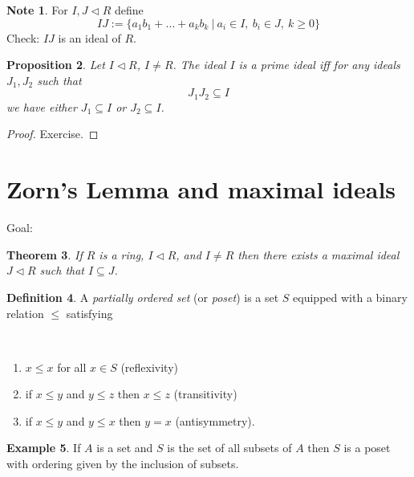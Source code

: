 \documentclass[12pt, letterpaper, oneside]{article}
\theoremstyle{plain}
\newtheorem{theorem}{Theorem}[section]
\newtheorem{proposition}[theorem]{Proposition}
\theoremstyle{definition}
\newtheorem{definition}[theorem]{Definition}
\newtheorem{example}[theorem]{Example}
\newtheorem{note}[theorem]{Note}
\newcommand{\benu}{\begin{enumerate}}
\newcommand{\eenu}{\end{enumerate}}
\newcommand{\vs}{\vskip 5mm}
\newcommand{\isep}[1][0]{\setlength{\itemsep}{#1 mm}}
\begin{document}
\vs\vs

\begin{note}
For $I, J \lhd R$ define 
$$IJ := \{ a_{1}b_{1} + {\dots} + a_{k}b_{k}  \ | \ a_{i} \in I, \ b_{i} \in J, \ k\geq 0 \}$$
Check: $IJ$ is an ideal of $R$.
\end{note}


\vs\vs

\begin{proposition}
\label{PROP_PRIMEIDPRODCHAR}
Let $I\lhd R$, $I\neq R$. The ideal $I$ is a prime ideal iff for any ideals $J_{1}, J_{2}$ such that 
$$J_{1}J_{2}\subseteq I$$
we have either $J_{1}\subseteq I$ or  $J_{2}\subseteq I$.
\end{proposition}

\begin{proof}
Exercise.
\end{proof}




\newpage
\section{Zorn's Lemma and maximal ideals}
\label{SEC_ZORNANDMAXIDEALS}

Goal:

\begin{theorem}
\label{THM_INCINTOMAXID}
If $R$ is a ring,  $I\lhd R$, and $I\neq R$ then there exists a maximal ideal $J\lhd R$ such that 
$I\subseteq J$. 
\end{theorem}

\vs\vs

\begin{definition}
A \emph{partially ordered set} (or \emph{poset}) is a set $S$ equipped with a binary relation $\leq$
satisfying

\vskip -13mm

\ 
\benu
\isep[0]
\item $x\leq x$ for all $x\in S$ (reflexivity)
\item if $x\leq y$ and $y\leq z$ then $x\leq z$ (transitivity)
\item if $x\leq y$ and $y\leq x$ then $y = x$ (antisymmetry). 
\eenu

\end{definition}


\vs\vs

\begin{example}
If $A$ is a set and $S$ is the set of all subsets of $A$ then $S$ is a poset with ordering 
given by the inclusion of subsets. 
\end{example}
\end{document}
